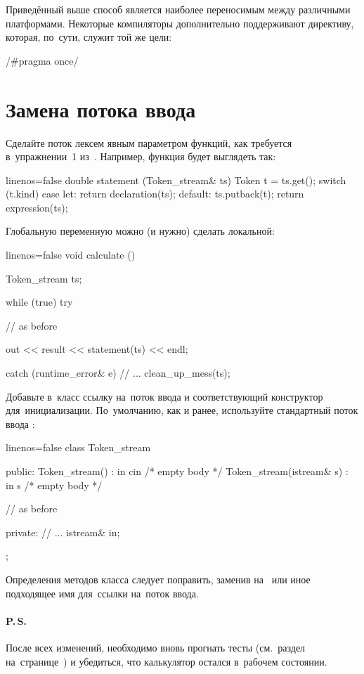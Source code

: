 Приведённый выше способ является наиболее переносимым между различными платформами. Некоторые компиляторы дополнительно поддерживают директиву, которая, по~сути, служит той же цели:

\cpp/#pragma once/



\section{Замена потока ввода}
Сделайте поток лексем явным параметром функций, как требуется в~упражнении~1 из~. Например, функция  будет выглядеть так:

\begin{cppcode*}{linenos=false}
double statement (Token_stream& ts)
{
  Token t = ts.get();
  switch (t.kind)
  {
    case let:
      return declaration(ts);
    default:
      ts.putback(t);
      return expression(ts);
  }
}
\end{cppcode*}

\noindent Глобальную переменную  можно (и нужно) сделать локальной:
\begin{cppcode*}{linenos=false}
void calculate ()
{
  Token_stream ts;

  while (true)
  try
  {
// as before

    out << result << statement(ts) << endl;
  }
  catch (runtime_error& e)
  {
// ...
    clean_up_mess(ts);
  }
}
\end{cppcode*}

Добавьте в~класс  ссылку на~поток ввода и соответствующий конструктор для~инициализации. По~умолчанию, как и ранее, используйте стандартный поток ввода :

\begin{cppcode*}{linenos=false}
class Token_stream
{
  public:
  Token_stream() : in{ cin } {/* empty body */}
  Token_stream(istream& s) : in{ s } {/* empty body */}

// as before

  private:
// ...
  istream& in;
};
\end{cppcode*}

\noindent Определения методов класса следует поправить, заменив  на~ или иное подходящее имя для~ссылки на~поток ввода.



\paragraph{P.\,S.}
После всех изменений, необходимо вновь прогнать тесты (см.~раздел на~странице~\pageref{sect:autotests}) и убедиться, что калькулятор остался в~рабочем состоянии.




